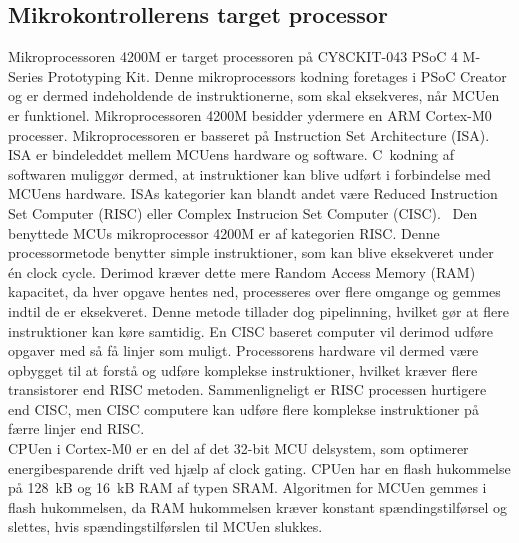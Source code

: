 \subsection{Mikrokontrollerens target processor}
Mikroprocessoren 4200M er target processoren på CY8CKIT-043 PSoC 4 M-Series Prototyping Kit. Denne mikroprocessors kodning foretages i PSoC Creator og er dermed indeholdende de instruktionerne, som skal eksekveres, når MCUen er funktionel. Mikroprocessoren 4200M besidder ydermere en ARM Cortex-M0 processer. \newline
Mikroprocessoren er basseret på Instruction Set Architecture (ISA). ISA er bindeleddet mellem MCUens hardware og software. C~kodning af softwaren muliggør dermed, at instruktioner kan blive udført i forbindelse med MCUens hardware. ISAs kategorier kan blandt andet være Reduced Instruction Set Computer (RISC) eller Complex Instrucion Set Computer (CISC).~\citep{CYPRESS2016Cortexm0,Semiconductor20164200M,Yadav2016} \newline
Den benyttede MCUs mikroprocessor 4200M er af kategorien RISC. Denne processormetode benytter simple instruktioner, som kan blive eksekveret under én clock cycle. Derimod kræver dette mere Random Access Memory (RAM) kapacitet, da hver opgave hentes ned, processeres over flere omgange og gemmes indtil de er eksekveret. Denne metode tillader dog pipelinning, hvilket gør at flere instruktioner kan køre samtidig. En CISC baseret computer vil derimod udføre opgaver med så få linjer som muligt. Processorens hardware vil dermed være opbygget til at forstå og udføre komplekse instruktioner, hvilket kræver flere transistorer end RISC metoden. Sammenligneligt er RISC processen hurtigere end CISC, men CISC computere kan udføre flere komplekse instruktioner på færre linjer end RISC.~\citep{CYPRESS2016Cortexm0,Semiconductor20164200M,Yadav2016}\\
CPUen i Cortex-M0 er en del af det 32-bit MCU delsystem, som optimerer energibesparende drift ved hjælp af clock gating. CPUen har en flash hukommelse på 128~kB og 16~kB RAM af typen SRAM. Algoritmen for MCUen gemmes i flash hukommelsen, da RAM hukommelsen kræver konstant spændingstilførsel og slettes, hvis spændingstilførslen til MCUen slukkes.~\citep{Semiconductor20164200M}

